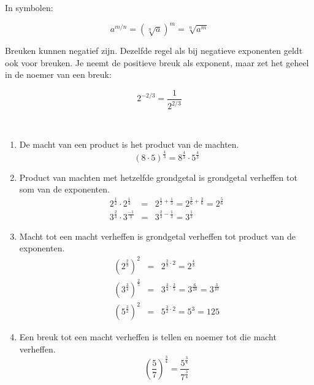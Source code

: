 In symbolen:

\begin{equation*}
a^{m/n} = (\sqrt[n]{a})^m = \sqrt[n]{a^m}
\end{equation*}

Breuken kunnen negatief zijn. Dezelfde regel als bij negatieve exponenten geldt ook voor breuken. Je neemt de positieve breuk als exponent, maar zet het geheel in de noemer van een breuk:

\begin{equation*}
2^{-2/3}= \frac{1}{2^{2/3}}
\end{equation*}

\begin{ftrekenregel}
	\ \\
	\begin{enumerate}
		\item De macht van een product is het product van de machten.
		\begin{equation*}
		(8 \cdot 5)^{\frac{4}{3}}=8^{\frac{4}{3}} \cdot 5^{\frac{4}{3}}
		\end{equation*}
		\item Product van machten met hetzelfde grondgetal is grondgetal verheffen tot som van de exponenten.
		\begin{eqnarray*}
			2^{\frac{1}{2}} \cdot 2^{\frac{1}{3}} &=& 2^{\frac{1}{2}+\frac{1}{3}} = 2^{\frac{5}{6}+\frac{2}{6}} = 2^{\frac{5}{6}} \\
			3^{\frac{2}{3}} \cdot 3^{\frac{-1}{3}} &=& 3^{\frac{2}{3}-\frac{1}{3}} = 3^{\frac{1}{3}} 
		\end{eqnarray*}
		\item Macht tot een macht verheffen is grondgetal verheffen tot product van de exponenten.
		\begin{eqnarray*}
			(2^{\frac{2}{3}})^{2} &=& 2^{\frac{2}{3} \cdot 2} = 2^{\frac{4}{3}} \\
			(3^{\frac{3}{4}})^{\frac{2}{5}} &=& 3^{\frac{3}{4} \cdot \frac{2}{5}} = 3^{\frac{6}{20}} =  3^{\frac{3}{10}}\\
			(5^{\frac{3}{2}})^{2} &=& 5^{\frac{3}{2} \cdot 2} = 5^{3} = 125
		\end{eqnarray*}
		\item Een breuk tot een macht verheffen is tellen en noemer tot die macht verheffen.
		\begin{equation*}
		(\frac{5}{7})^{\frac{3}{4}}=\frac{5^{\frac{3}{4}}}{7^{\frac{3}{4}}}
		\end{equation*}
	\end{enumerate}
\end{ftrekenregel}


